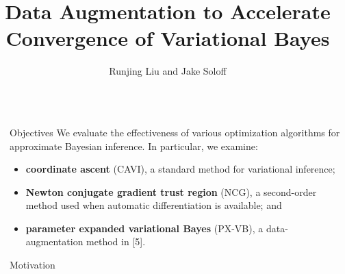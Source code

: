 \documentclass[final]{beamer}
\title{Data Augmentation to Accelerate Convergence of Variational Bayes} %
\author{Runjing Liu and Jake Soloff} %
\institute{Department of Statistics, UC Berkeley} %
\newlength{\sepwid}
\newlength{\onecolwid}
\begin{document}

\setlength{\belowcaptionskip}{2ex} %
\setlength\belowdisplayshortskip{2ex} %

\begin{frame}[t] %

\begin{columns}[t] %

\begin{column}{\sepwid}\end{column} %

\begin{column}{\onecolwid} %


\begin{alertblock}{Objectives}
We evaluate the effectiveness of various optimization algorithms for approximate Bayesian inference. In particular, we examine: \vspace{-.5em}
\begin{itemize}
\item {\bf coordinate ascent} (CAVI), a standard method for variational inference;
\item {\bf Newton conjugate gradient trust region} (NCG), a second-order method used when automatic differentiation is available; and
\item {\bf parameter expanded variational Bayes} (PX-VB), a data-augmentation method in [5]. 
\end{itemize}


\end{alertblock}


\begin{block}{Motivation}


\end{block}
\end{column}
\end{columns}
\end{frame}
\end{document}
